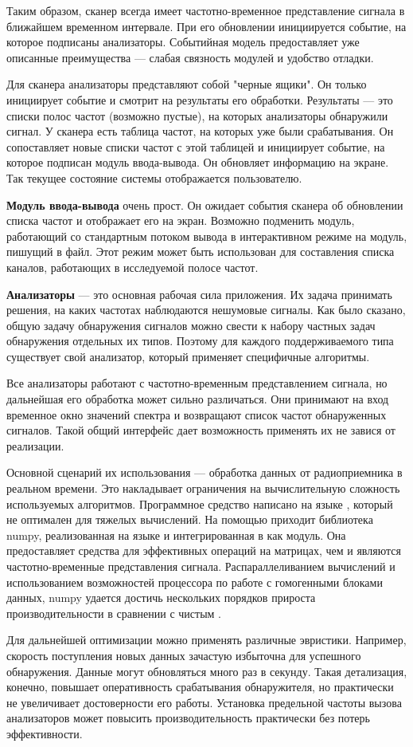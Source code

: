 Таким образом, сканер всегда имеет частотно-временное представление сигнала в ближайшем временном интервале. При его обновлении инициируется событие, на которое подписаны анализаторы. Событийная модель предоставляет уже описанные преимущества --- слабая связность модулей и удобство отладки.

Для сканера анализаторы представляют собой "черные ящики". Он только инициирует событие и смотрит на результаты его обработки. Результаты --- это списки полос частот (возможно пустые), на которых анализаторы обнаружили сигнал. У сканера есть таблица частот, на которых уже были срабатывания. Он сопоставляет новые списки частот с этой таблицей и инициирует событие, на которое подписан модуль ввода-вывода. Он обновляет информацию на экране. Так текущее состояние системы отображается пользователю.

\textbf{Модуль ввода-вывода} очень прост. Он ожидает события сканера об обновлении списка частот и отображает его на экран. Возможно подменить модуль, работающий со стандартным потоком вывода в интерактивном режиме на модуль, пишущий в файл. Этот режим может быть использован для составления списка каналов, работающих в исследуемой полосе частот.

\textbf{Анализаторы} --- это основная рабочая сила приложения. Их задача принимать решения, на каких частотах наблюдаются нешумовые сигналы. Как было сказано, общую задачу обнаружения сигналов можно свести к набору частных задач обнаружения отдельных их типов. Поэтому для каждого поддерживаемого типа существует свой анализатор, который применяет специфичные алгоритмы.

Все анализаторы работают с частотно-временным представлением сигнала, но дальнейшая его обработка может сильно различаться. Они принимают на вход временное окно значений спектра и возвращают список частот обнаруженных сигналов. Такой общий интерфейс дает возможность применять их не завися от реализации.

Основной сценарий их использования --- обработка данных от радиоприемника в реальном времени. Это накладывает ограничения на вычислительную сложность используемых алгоритмов. Программное средство написано на языке \python, который не оптимален для тяжелых вычислений. На помощью приходит библиотека numpy, реализованная на языке \purec и интегрированная в \python как модуль. Она предоставляет средства для эффективных операций на матрицах, чем и являются частотно-временные представления сигнала. Распараллеливанием вычислений и использованием возможностей процессора по работе с гомогенными блоками данных, numpy удается достичь нескольких порядков прироста производительности в сравнении с чистым \python.

Для дальнейшей оптимизации можно применять различные эвристики. Например, скорость поступления новых данных зачастую избыточна для успешного обнаружения. Данные могут обновляться много раз в секунду. Такая детализация, конечно, повышает оперативность срабатывания обнаружителя, но практически не увеличивает достоверности его работы. Установка предельной частоты вызова анализаторов может повысить производительность практически без потерь эффективности.
